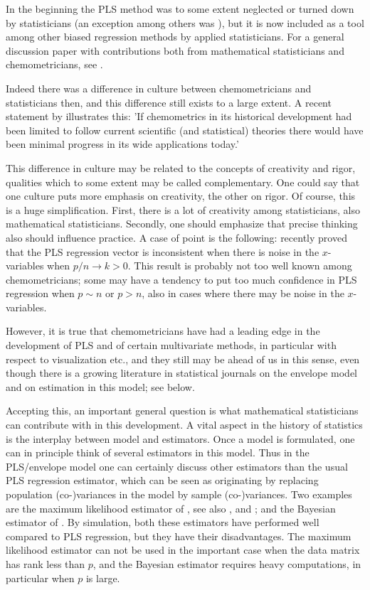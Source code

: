 \documentclass[a4paper, 11pt]{article}
\begin{document}
In the beginning the PLS method was to some extent neglected or turned down by
statisticians (an exception among others was \citealp*{frank1993statistical}),
but it is now included as a tool among other biased regression methods by
applied statisticians. For a general discussion paper with contributions both
from mathematical statisticians and chemometricians, see
\citet{sundberg1999multivariate}.

Indeed there was a difference in culture between chemometricians and
statisticians then, and this difference still exists to a large extent. A recent
statement by \citet{munck2010physiochemical} illustrates this: 'If chemometrics
in its historical development had been limited to follow current scientific (and
statistical) theories there would have been minimal progress in its wide
applications today.'

This difference in culture may be related to the concepts of creativity and
rigor, qualities which to some extent may be called complementary. One could say
that one culture puts more emphasis on creativity, the other on rigor. Of
course, this is a huge simplification. First, there is a lot of creativity among
statisticians, also mathematical statisticians. Secondly, one should emphasize
that precise thinking also should influence practice. A case of point is the
following: \citet{chung2010sparse} recently proved that the PLS regression
vector is inconsistent when there is noise in the $x$-variables when
$p/n\rightarrow k>0$. This result is probably not too well known among
chemometricians; some may have a tendency to put too much confidence in PLS
regression when $p\sim n$ or $p>n$, also in cases where there may be noise in
the $x$-variables.

However, it is true that chemometricians have had a leading edge in the
development of PLS and of certain multivariate methods, in particular with
respect to visualization etc., and they still may be ahead of us in this sense,
even though there is a growing literature in statistical journals on the
envelope model and on estimation in this model; see below.

Accepting this, an important general question is what mathematical statisticians
can contribute with in this development. A vital aspect in the history of
statistics is the interplay between model and estimators. Once a model is
formulated, one can in principle think of several estimators in this model. Thus
in the PLS/envelope model one can certainly discuss other estimators than the
usual PLS regression estimator, which can be seen as originating by replacing
population (co-)variances in the model by sample (co-)variances. Two examples
are the maximum likelihood estimator of \citet{cook2013envelopes}, see also
\citet{cook2015envlp}, \citet{cook2016note} and \citet{cook2016algorithms}; and
the Bayesian estimator of \citet{helland2012near}. By simulation, both these
estimators have performed well compared to PLS regression, but they have their
disadvantages. The maximum likelihood estimator can not be used in the important
case when the data matrix has rank less than $p$, and the Bayesian estimator
requires heavy computations, in particular when $p$ is large.
\end{document}
